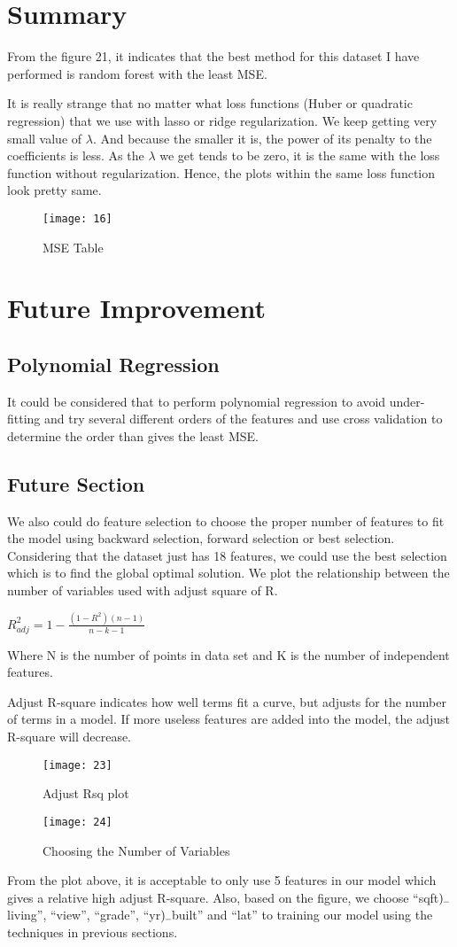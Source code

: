 \documentclass[12pt,twocolumn,twoside]{article}
\begin{document}
\section{Summary}
From the figure 21, it indicates that the best method for this dataset I have performed is random forest with the least MSE.

It is really strange that no matter what loss functions (Huber or quadratic regression) that we use with lasso or ridge regularization. We keep getting very small value of $\lambda$. And because the smaller it is, the power of its penalty to the coefficients is less. As the $\lambda$ we get tends to be zero, it is the same with the loss function without regularization. Hence, the plots within the same loss function look pretty same. 
\begin{figure}[h]
\texttt{[image: 16]}
\caption{MSE Table}
\end{figure}

\section{Future Improvement}
\subsection{Polynomial Regression}
It could be considered that to perform polynomial regression to avoid under-fitting and try several different orders of the features and use cross validation to determine the order than gives the least MSE.

\subsection{Future Section}
We also could do feature selection to choose the proper number of features to fit the model using backward selection, forward selection or best selection. Considering that the dataset just has 18 features, we could use the best selection which is to find the global optimal solution. We plot the relationship between the number of variables used with adjust square of R. 
\begin{center}
$R_{adj}^2=1-\frac{(1-R^2)(n-1)}{n-k-1}$
\end{center}
Where N is the number of points in data set and K is the number of independent features.
 
Adjust R-square indicates how well terms fit a curve, but adjusts for the number of terms in a model. If more useless features are added into the model, the adjust R-square will decrease. 
\begin{figure}[h]
\texttt{[image: 23]}
\caption{Adjust Rsq plot}
\end{figure}
\begin{figure}[h]
\texttt{[image: 24]}
\caption{Choosing the Number of Variables}
\end{figure}
From the plot above, it is acceptable to only use 5 features in our model which gives a relative high adjust R-square. Also, based on the figure, we choose “sqft$\rule{0.15cm}{0.1mm)}$living”, “view”, “grade”, “yr$\rule{0.15cm}{0.1mm)}$built” and “lat” to training our model using the techniques in previous sections.
\end{document}
